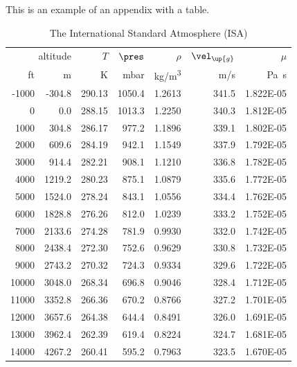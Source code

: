 \label{ch:isa}
\begin{mycomments}
This is an example of an appendix with a table.
\end{mycomments}

\begin{table}[ht!]\centering
	\caption{The International Standard Atmosphere (ISA)}\label{tab:isa}
	\begin{tabular}{rrrrrrr}
		\toprule
		\multicolumn{2}{r}{altitude} &  $T$ & $\pres$ &   $\rho$ &  $\vel_\up{g}$ &  $\mu$ \\[+1.5ex] %
		ft   & m    &  K    &  mbar  & \si{kg/m^3} &  m/s &  \si{\pascal\second} \\ [+1.5ex] 
        	-1000	&	-304.8	&	290.13	&	1050.4	&	1.2613	&	341.5	&	1.822E-05	\\
        	0	    &	0.0	    &	288.15	&	1013.3	&	1.2250	&	340.3	&	1.812E-05	\\
        	1000	&	304.8	&	286.17	&	977.2	&	1.1896	&	339.1	&	1.802E-05	\\
        	2000	&	609.6	&	284.19	&	942.1	&	1.1549	&	337.9	&	1.792E-05	\\
        	3000	&	914.4	&	282.21	&	908.1	&	1.1210	&	336.8	&	1.782E-05	\\
        	4000	&	1219.2	&	280.23	&	875.1	&	1.0879	&	335.6	&	1.772E-05	\\
        	5000	&	1524.0	&	278.24	&	843.1	&	1.0556	&	334.4	&	1.762E-05	\\
        	6000	&	1828.8	&	276.26	&	812.0	&	1.0239	&	333.2	&	1.752E-05	\\
        	7000	&	2133.6	&	274.28	&	781.9	&	0.9930	&	332.0	&	1.742E-05	\\
        	8000	&	2438.4	&	272.30	&	752.6	&	0.9629	&	330.8	&	1.732E-05	\\
        	9000	&	2743.2	&	270.32	&	724.3	&	0.9334	&	329.6	&	1.722E-05	\\
        	10000	&	3048.0	&	268.34	&	696.8	&	0.9046	&	328.4	&	1.712E-05	\\
        	11000	&	3352.8	&	266.36	&	670.2	&	0.8766	&	327.2	&	1.701E-05	\\
        	12000	&	3657.6	&	264.38	&	644.4	&	0.8491	&	326.0	&	1.691E-05	\\
        	13000	&	3962.4	&	262.39	&	619.4	&	0.8224	&	324.7	&	1.681E-05	\\
        	14000	&	4267.2	&	260.41	&	595.2	&	0.7963	&	323.5	&	1.670E-05	\\

\end{tabular}
\end{table}
